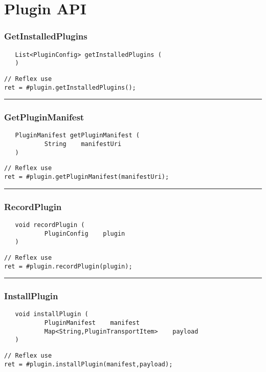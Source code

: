 \section{Plugin API}

\subsubsection{GetInstalledPlugins}
\label{Api:GetInstalledPlugins}
\begin{verbatim}
   List<PluginConfig> getInstalledPlugins (
   )
\end{verbatim}
\begin{lstlisting}[language=reflex]
// Reflex use
ret = #plugin.getInstalledPlugins();
\end{lstlisting}



\rule{15cm}{2pt}
\subsubsection{GetPluginManifest}
\label{Api:GetPluginManifest}
\begin{verbatim}
   PluginManifest getPluginManifest (
           String    manifestUri
   )
\end{verbatim}
\begin{lstlisting}[language=reflex]
// Reflex use
ret = #plugin.getPluginManifest(manifestUri);
\end{lstlisting}



\rule{15cm}{2pt}
\subsubsection{RecordPlugin}
\label{Api:RecordPlugin}
\begin{verbatim}
   void recordPlugin (
           PluginConfig    plugin
   )
\end{verbatim}
\begin{lstlisting}[language=reflex]
// Reflex use
ret = #plugin.recordPlugin(plugin);
\end{lstlisting}



\rule{15cm}{2pt}
\subsubsection{InstallPlugin}
\label{Api:InstallPlugin}
\begin{verbatim}
   void installPlugin (
           PluginManifest    manifest
           Map<String,PluginTransportItem>    payload
   )
\end{verbatim}
\begin{lstlisting}[language=reflex]
// Reflex use
ret = #plugin.installPlugin(manifest,payload);
\end{lstlisting}



